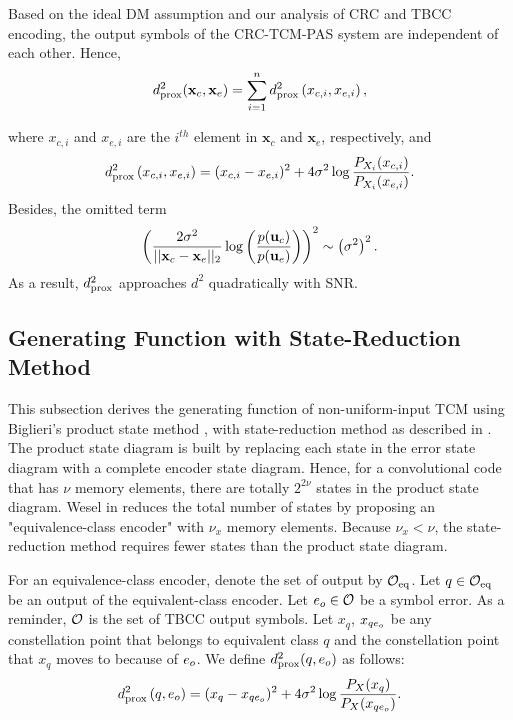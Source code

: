 \documentclass [PhD] {uclathes}
\begin{document}
Based on the ideal DM assumption and our analysis of CRC and TBCC encoding, the output symbols of the CRC-TCM-PAS system are independent of each other. Hence, 
\begin{align}
d_{\mathrm{prox}}^2(\mathbf{x}_{c}, \mathbf{x}_{e}) = \sum_{i=1}^nd_{\mathrm{prox}}^2\left(x_{c,i},x_{e,i}\right),
\end{align} 

where $x_{c,i}$ and $x_{e,i}$ are the $i^{th}$ element in $\mathbf{x}_c$ and $\mathbf{x}_e$, respectively, and
\begin{align}\label{equ: symbolwise_da}
    d_{\mathrm{prox}}^2\left(x_{c,i},x_{e,i}\right)=(x_{c,i}-x_{e,i})^2+4\sigma^2\log\frac{P_{X_i}(x_{c,i})}{P_{X_i}(x_{e,i})}.
\end{align}
Besides, the omitted term
\begin{equation}
    \left(\frac{2\sigma^2}{||\mathbf{x}_{c} - \mathbf{x}_{e} ||_2}\log\left(\frac{p(\mathbf{u}_{c})}{p(\mathbf{u}_{e})}\right)\right)^2\sim \left(\sigma^2\right)^2.
\end{equation}
As a result, $d_{\mathrm{prox}}^2$ approaches $d^2$ quadratically with SNR.

\subsection{Generating Function with State-Reduction Method}
This subsection derives the generating function of non-uniform-input TCM using Biglieri's product state method \cite{biglieri1984productstate}, with state-reduction method as described in \cite{wesel2004statereduction}. The product state diagram\cite{biglieri1984productstate} is built by replacing each state in the error state diagram with a complete encoder state diagram. Hence, for a convolutional code that has $\nu$ memory elements, there are totally $2^{2\nu}$ states in the product state diagram. Wesel in \cite{wesel2004statereduction} reduces the total number of states by proposing an "equivalence-class encoder" with $\nu_x$ memory elements.  Because $\nu_x<\nu$, the state-reduction method requires fewer states than the product state diagram. 

For an equivalence-class encoder, denote the set of output by $\mathcal{O}_\text{eq}$. Let $q\in\mathcal{O}_\text{eq}$ be an output of the equivalent-class encoder. Let $e_o\in\mathcal{O}$ be a symbol error. As a reminder, $\mathcal{O}$ is the set of TBCC output symbols. Let $x_q$, $x_{qe_o}$ be any constellation point that belongs to equivalent class $q$ and the constellation point that $x_q$ moves to because of $e_o$.  We define $d_{\mathrm{prox}}^2(q,e_o)$ as follows:
\begin{align}
    d_{\mathrm{prox}}^2\left(q,e_o\right)=(x_{q}-x_{qe_o})^2+4\sigma^2\log\frac{P_{X}(x_{q})}{P_{X}(x_{qe_o})}.
\end{align}
\end{document}
